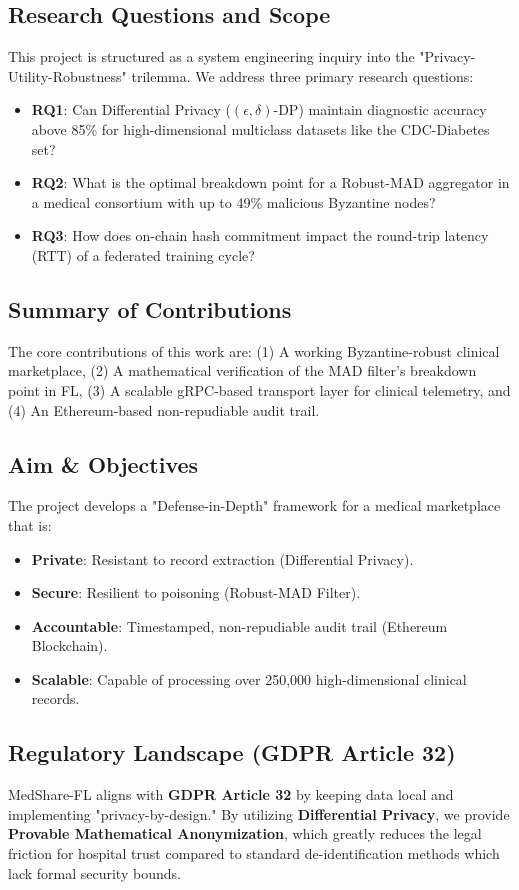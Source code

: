 \documentclass[10pt, a4paper, twocolumn]{article}
\begin{document}
\subsection{Research Questions and Scope}
This project is structured as a system engineering inquiry into the "Privacy-Utility-Robustness" trilemma. We address three primary research questions:
\begin{itemize}
    \item \textbf{RQ1}: Can Differential Privacy ($(\epsilon, \delta)$-DP) maintain diagnostic accuracy above 85\% for high-dimensional multiclass datasets like the CDC-Diabetes set?
    \item \textbf{RQ2}: What is the optimal breakdown point for a Robust-MAD aggregator in a medical consortium with up to 49\% malicious Byzantine nodes?
    \item \textbf{RQ3}: How does on-chain hash commitment impact the round-trip latency (RTT) of a federated training cycle?
\end{itemize}

\subsection{Summary of Contributions}
The core contributions of this work are: (1) A working Byzantine-robust clinical marketplace, (2) A mathematical verification of the MAD filter's breakdown point in FL, (3) A scalable gRPC-based transport layer for clinical telemetry, and (4) An Ethereum-based non-repudiable audit trail.

\subsection{Aim \& Objectives}
The project develops a "Defense-in-Depth" framework for a medical marketplace that is:
\begin{itemize}
    \item \textbf{Private}: Resistant to record extraction (Differential Privacy).
    \item \textbf{Secure}: Resilient to poisoning (Robust-MAD Filter).
    \item \textbf{Accountable}: Timestamped, non-repudiable audit trail (Ethereum Blockchain).
    \item \textbf{Scalable}: Capable of processing over 250,000 high-dimensional clinical records.
\end{itemize}

\subsection{Regulatory Landscape (GDPR Article 32)}
MedShare-FL aligns with \textbf{GDPR Article 32} by keeping data local and implementing "privacy-by-design." By utilizing \textbf{Differential Privacy}, we provide \textbf{Provable Mathematical Anonymization}, which greatly reduces the legal friction for hospital trust compared to standard de-identification methods which lack formal security bounds.
\end{document}
